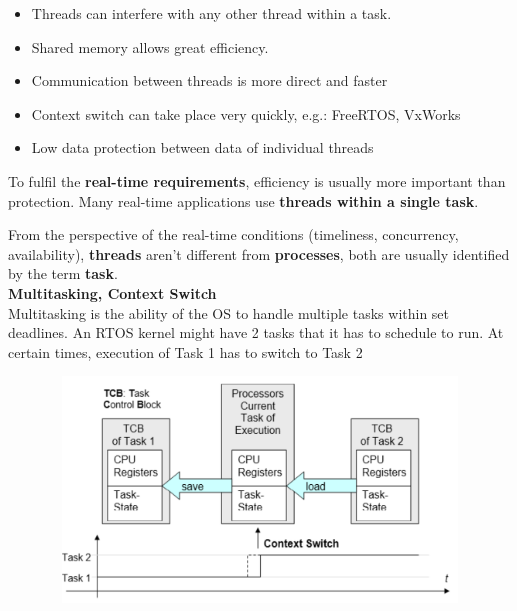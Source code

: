 \begin{itemize}
	\item Threads can interfere with any other thread within a task.
	\item Shared memory allows great efficiency.
	\item Communication between threads is more direct and faster
	\item Context switch can take place very quickly, e.g.: FreeRTOS, VxWorks
	\item Low data protection between data of individual threads
\end{itemize}

To fulfil the \textbf{real-time requirements}, efficiency is usually more important than protection. Many real-time applications use \textbf{threads within a single task}.\\


From the perspective of the real-time conditions (timeliness, concurrency, availability), \textbf{threads} aren't different from \textbf{processes}, both are usually identified by the term \textbf{task}.\\

{\rot\bf Multitasking, Context Switch }\\

Multitasking is the ability of the OS to handle multiple tasks within set deadlines. An RTOS kernel might have 2 tasks that it has to schedule to run. At certain times, execution of Task 1 has to switch to Task 2

	\begin{figure}[h]
    \centering
    \includegraphics[width=13cm, height=6cm]{Images/image81.png}
    \label{fig:Fig 27}
    \end{figure}
\os{\newpage}

